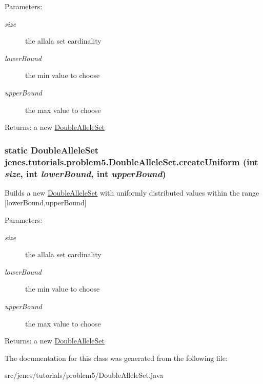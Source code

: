 \begin{Desc}
\item[Parameters:]
\begin{description}
\item[{\em size}]the allala set cardinality \item[{\em lowerBound}]the min value to choose \item[{\em upperBound}]the max value to choose \end{description}
\end{Desc}
\begin{Desc}
\item[Returns:]a new \hyperlink{classjenes_1_1tutorials_1_1problem5_1_1_double_allele_set}{DoubleAlleleSet} \end{Desc}
\hypertarget{classjenes_1_1tutorials_1_1problem5_1_1_double_allele_set_75aa1cf3be84d1e3f5e50ecc0acc5b4b}{
\subsubsection[createUniform]{\setlength{\rightskip}{0pt plus 5cm}static {\bf DoubleAlleleSet} jenes.tutorials.problem5.DoubleAlleleSet.createUniform (int {\em size}, \/  int {\em lowerBound}, \/  int {\em upperBound})}}
\label{classjenes_1_1tutorials_1_1problem5_1_1_double_allele_set_75aa1cf3be84d1e3f5e50ecc0acc5b4b}


Builds a new \hyperlink{classjenes_1_1tutorials_1_1problem5_1_1_double_allele_set}{DoubleAlleleSet} with uniformly distributed values within the range \mbox{[}lowerBound,upperBound\mbox{]} 

\begin{Desc}
\item[Parameters:]
\begin{description}
\item[{\em size}]the allala set cardinality \item[{\em lowerBound}]the min value to choose \item[{\em upperBound}]the max value to choose \end{description}
\end{Desc}
\begin{Desc}
\item[Returns:]a new \hyperlink{classjenes_1_1tutorials_1_1problem5_1_1_double_allele_set}{DoubleAlleleSet} \end{Desc}


The documentation for this class was generated from the following file:\begin{CompactItemize}
\item 
src/jenes/tutorials/problem5/DoubleAlleleSet.java\end{CompactItemize}
